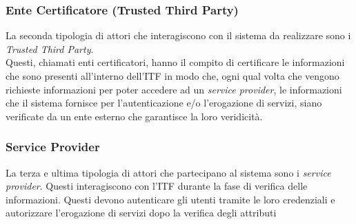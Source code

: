 \subsubsection{Ente Certificatore (Trusted Third Party)}
La seconda tipologia di attori che interagiscono con il sistema da realizzare sono i \textit{Trusted Third Party}.\\
Questi, chiamati enti certificatori, hanno il compito di certificare le informazioni che sono presenti all'interno dell'\gls{ITF} in modo che, ogni qual volta che vengono richieste informazioni per poter accedere ad un \textit{service provider}, le informazioni che il sistema fornisce per l'autenticazione e/o l'erogazione di servizi, siano verificate da un ente esterno che garantisce la loro veridicità.
\subsubsection{Service Provider}
La terza e ultima tipologia di attori che partecipano al sistema sono i \textit{service provider}.
Questi interagiscono con l'\gls{ITF} durante la fase di verifica delle informazioni. Questi devono autenticare gli utenti tramite le loro credenziali e autorizzare l'erogazione di servizi dopo la verifica degli attributi
